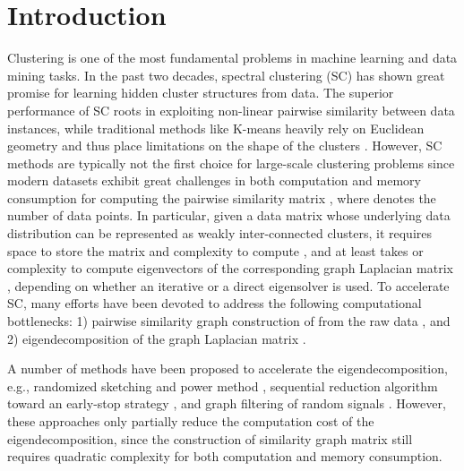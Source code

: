 \documentclass[sigconf]{acmart}
\newcommand{\1}{\boldsymbol{1}}
\newcommand{\0}{\boldsymbol{0}}
\begin{document}
\section{Introduction}
Clustering is one of the most fundamental problems in machine learning and data mining tasks. In the past two decades, spectral clustering (SC) \cite{shi2000normalized,ng2002spectral,von2007tutorial,chen2017revisiting} has shown great promise for learning hidden cluster structures from data. The superior performance of SC roots in exploiting non-linear pairwise similarity between data instances, while traditional methods like K-means heavily rely on Euclidean geometry and thus place limitations on the shape of the clusters \cite{fowlkes2004spectral,yan2009fast,chen2016phase}. However, SC methods are typically not the first choice for large-scale clustering problems since modern datasets exhibit great challenges in both computation and memory consumption for computing the pairwise similarity matrix , where  denotes the number of data points. In particular, given a data matrix  whose underlying data distribution can be represented as   weakly inter-connected clusters, it requires  space to store the matrix and  complexity to compute , and at least takes  or  complexity to compute  eigenvectors of the corresponding graph Laplacian matrix , depending on whether an iterative or a direct eigensolver is used. To accelerate SC, many efforts have been devoted to address the following computational bottlenecks: 1) pairwise similarity graph construction of  from the raw data , and 2) eigendecomposition of  the graph Laplacian matrix . 

A number of methods have been proposed to accelerate the eigendecomposition, e.g.,  randomized sketching and power method \cite{gittens2013approximate,lin2010power},  sequential reduction algorithm toward an early-stop strategy \cite{chen2006fast,liu2007fast}, and graph filtering of random signals \cite{tremblay2016compressive}. However,  these approaches only partially reduce the computation cost of the eigendecomposition, since the construction of similarity graph matrix  still requires quadratic complexity for both computation and memory consumption. 
\end{document}
